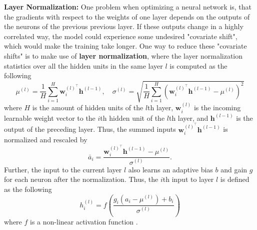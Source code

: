 \documentclass[./main.tex]{subfiles}
\begin{document}
\noindent \textbf{Layer Normalization: } One problem when optimizing a neural network is, that the gradients with respect to the weights of one layer depends on the outputs of the neurons of the previous previous layer. If these outputs change in a highly correlated way, the model could experience some undesired "covariate shift", which would make the training take longer. One way to reduce these "covariate shifts" is to make use of \textbf{layer normalization}, where the layer normalization statistics over all the hidden units in the same layer $l$ is computed as the following
\begin{equation}
    \mu^{(l)} = \frac{1}{H} \sum_{i = 1} ^H \bm{w}_i^{(l)^\top}\bm{h}^{(l - 1)}, \quad \sigma^{(l)} = \sqrt{\frac{1}{H} \sum_{i = 1} ^H \left(\bm{w}_i^{(l)^\top}\bm{h}^{(l - 1)} - \mu^{(l)}\right)^2}
\end{equation}
where $H$ is the amount of hidden units of the $l$th layer, $\bm{w}_i^{(l)}$ is the incoming learnable weight vector to the $i$th hidden unit of the $l$th layer, and $\bm{h}^{(l - 1)}$ is the output of the preceding layer. Thus, the summed inputs $\bm{w}^{(l)^\top} _i \bm{h}^{(l - 1)}$ is normalized and rescaled by
\begin{equation}
    \bar{a}_i = \frac{\bm{w}^{(l)^\top} _i \bm{h}^{(l - 1)} - \mu^{(l)}}{\sigma^{(l)}}.
\end{equation}
Further, the input to the current layer $l$ also learns an adaptive bias $b$ and gain $g$ for each neuron after the normalization. Thus, the $i$th input to layer $l$ is defined as the following
\begin{equation}
    h_i ^{(l)} = f\left(\frac{g_i(a_i - \mu^{(l)}) + b_i}{\sigma^{(l)}} \right)
\end{equation}
where $f$ is a non-linear activation function \cite{ba2016layer}.
\end{document}
